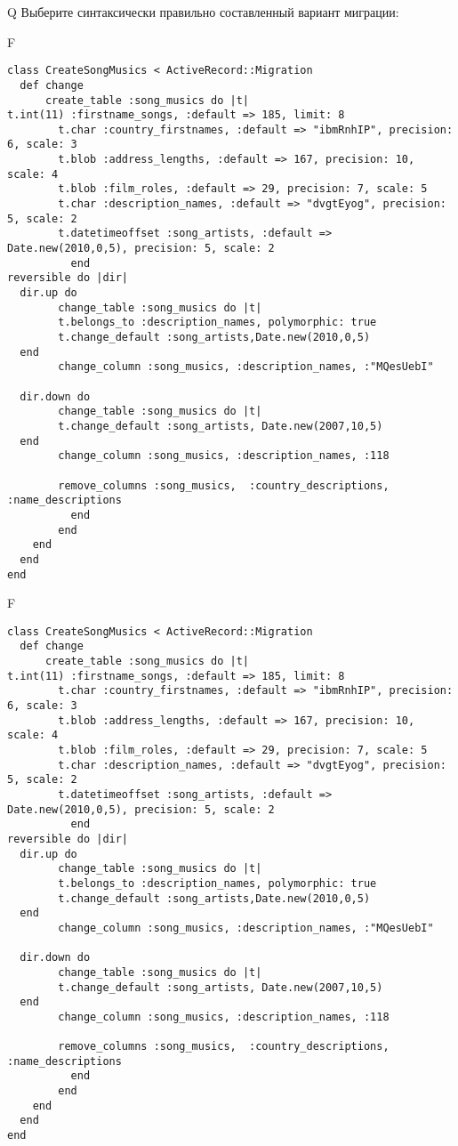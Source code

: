 Q
Выберите синтаксически правильно составленный вариант миграции:

F
\begin{verbatim}
class CreateSongMusics < ActiveRecord::Migration
  def change
	  create_table :song_musics do |t|
t.int(11) :firstname_songs, :default => 185, limit: 8
		t.char :country_firstnames, :default => "ibmRnhIP", precision: 6, scale: 3
		t.blob :address_lengths, :default => 167, precision: 10, scale: 4
		t.blob :film_roles, :default => 29, precision: 7, scale: 5
		t.char :description_names, :default => "dvgtEyog", precision: 5, scale: 2
		t.datetimeoffset :song_artists, :default => Date.new(2010,0,5), precision: 5, scale: 2
		  end
reversible do |dir|
  dir.up do
		change_table :song_musics do |t|
		t.belongs_to :description_names, polymorphic: true
 		t.change_default :song_artists,Date.new(2010,0,5)
  end
 		change_column :song_musics, :description_names, :"MQesUebI"
   
  dir.down do
		change_table :song_musics do |t|
		t.change_default :song_artists, Date.new(2007,10,5)
  end
 		change_column :song_musics, :description_names, :118
   
		remove_columns :song_musics,  :country_descriptions, :name_descriptions 
	      end
	    end
    end 
  end
end

\end{verbatim}

F
\begin{verbatim}
class CreateSongMusics < ActiveRecord::Migration
  def change
	  create_table :song_musics do |t|
t.int(11) :firstname_songs, :default => 185, limit: 8
		t.char :country_firstnames, :default => "ibmRnhIP", precision: 6, scale: 3
		t.blob :address_lengths, :default => 167, precision: 10, scale: 4
		t.blob :film_roles, :default => 29, precision: 7, scale: 5
		t.char :description_names, :default => "dvgtEyog", precision: 5, scale: 2
		t.datetimeoffset :song_artists, :default => Date.new(2010,0,5), precision: 5, scale: 2
		  end
reversible do |dir|
  dir.up do
		change_table :song_musics do |t|
		t.belongs_to :description_names, polymorphic: true
 		t.change_default :song_artists,Date.new(2010,0,5)
  end
 		change_column :song_musics, :description_names, :"MQesUebI"
   
  dir.down do
		change_table :song_musics do |t|
		t.change_default :song_artists, Date.new(2007,10,5)
  end
 		change_column :song_musics, :description_names, :118
   
		remove_columns :song_musics,  :country_descriptions, :name_descriptions 
	      end
	    end
    end 
  end
end

\end{verbatim}


